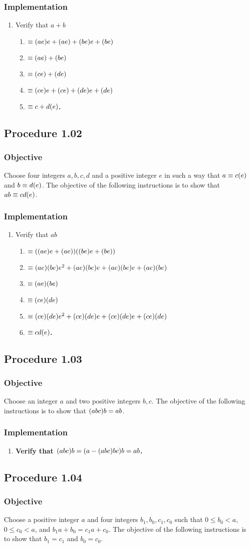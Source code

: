 \documentclass[twocolumn]{article}
\let\div\relax
\DeclareMathOperator{\div}{div}
\let\mod\relax
\DeclareMathOperator{\mod}{mod}
\newcommand{\procedure}[2][]{\subsection*{Procedure #2 \ifthenelse{\equal{#1}{}}{}{(#1)}}\label{sec:procedure #2}}
\newcommand{\objective}{\subsubsection*{Objective}}
\newcommand{\implementation}{\subsubsection*{Implementation}}
\begin{document}
			\implementation
				\begin{enumerate}
					\item Verify that $a+b$
					\begin{enumerate}
						\item $\equiv(a\div e)e+(a\mod e)+(b\div e)e+(b\mod e)$
						\item $\equiv(a\mod e)+(b\mod e)$
						\item $\equiv(c\mod e)+(d\mod e)$
						\item $\equiv(c\div e)e+(c\mod e)+(d\div e)e+(d\mod e)$
						\item \textbf{$\equiv c+d(\mod e)$.}
					\end{enumerate}
				\end{enumerate}
		\procedure{1.02}
			\objective
				Choose four integers $a,b,c,d$ and a positive integer $e$ in such a way that $a\equiv c(\mod e)$ and $b\equiv d(\mod e)$. The objective of the following instructions is to show that $ab\equiv cd(\mod e)$.
			\implementation
				\begin{enumerate}
					\item Verify that $ab$
					\begin{enumerate}
						\item $\equiv((a\div e)e+(a\mod e))((b\div e)e+(b\mod e))$
						\item $\equiv(a\div e)(b\div e)e^2+(a\div e)(b\mod e)e+(a\mod e)(b\div e)e+(a\mod e)(b\mod e)$
						\item $\equiv(a\mod e)(b\mod e)$
						\item $\equiv(c\mod e)(d\mod e)$
						\item $\equiv(c\div e)(d\div e)e^2+(c\div e)(d\mod e)e+(c\mod e)(d\div e)e+(c\mod e)(d\mod e)$
						\item \textbf{$\equiv cd(\mod e)$.}
					\end{enumerate}
				\end{enumerate}
		\procedure{1.03}
			\objective
				Choose an integer $a$ and two positive integers $b,c$. The objective of the following instructions is to show that $(a\mod bc)\mod b=a\mod b$.
			\implementation
				\begin{enumerate}
					\item \textbf{Verify that $(a\mod bc)\mod b=(a-(a\div bc)bc)\mod b=a\mod b$.}
				\end{enumerate}
		\procedure{1.04}
			\objective
				Choose a positive integer $a$ and four integers $b_1,b_0,c_1,c_0$ such that $0\le b_0<a$, $0\le c_0<a$, and $b_1a+b_0=c_1a+c_0$. The objective of the following instructions is to show that $b_1=c_1$ and $b_0=c_0$.
\end{document}
